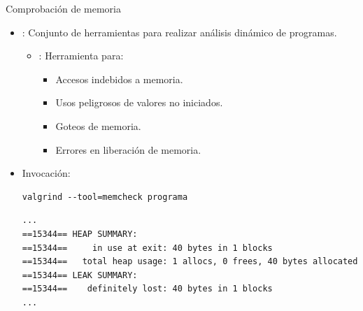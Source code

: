 \begin{frame}[fragile]{Comprobación de memoria}
\begin{itemize}
  \item {}: 
        Conjunto de herramientas para realizar análisis dinámico de programas.
    \begin{itemize}
      \item {}: Herramienta para:
        \begin{itemize}
          \item Accesos indebidos a memoria.
          \item Usos peligrosos de valores no iniciados.
          \item Goteos de memoria.
          \item Errores en liberación de memoria.
        \end{itemize}
    \end{itemize}
  \item Invocación:
\begin{lstlisting}[style=terminal]
valgrind --tool=memcheck programa
\end{lstlisting}
\begin{lstlisting}[style=terminal]
...
==15344== HEAP SUMMARY:
==15344==     in use at exit: 40 bytes in 1 blocks
==15344==   total heap usage: 1 allocs, 0 frees, 40 bytes allocated
==15344== LEAK SUMMARY:
==15344==    definitely lost: 40 bytes in 1 blocks
...
\end{lstlisting}
\end{itemize}
\end{frame}

